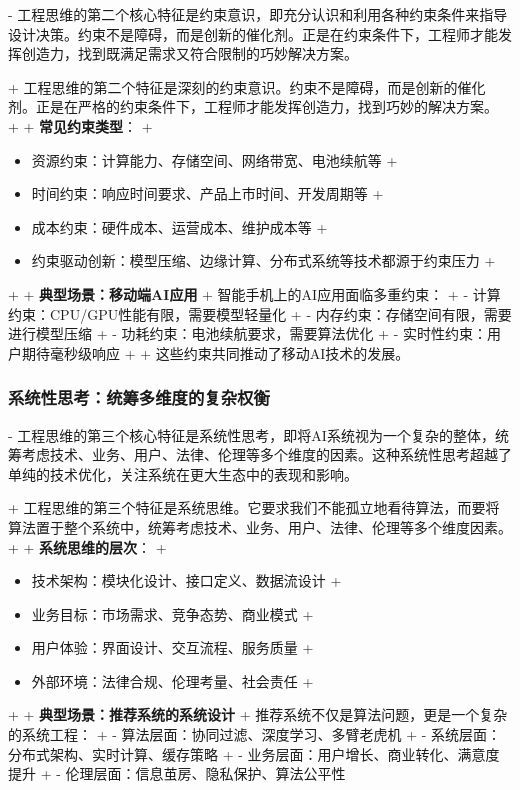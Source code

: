 - 工程思维的第二个核心特征是约束意识，即充分认识和利用各种约束条件来指导设计决策。约束不是障碍，而是创新的催化剂。正是在约束条件下，工程师才能发挥创造力，找到既满足需求又符合限制的巧妙解决方案。

+ 工程思维的第二个特征是深刻的约束意识。约束不是障碍，而是创新的催化剂。正是在严格的约束条件下，工程师才能发挥创造力，找到巧妙的解决方案。
+
+ \textbf{常见约束类型}：
+ \begin{itemize}
+ \item 资源约束：计算能力、存储空间、网络带宽、电池续航等
+ \item 时间约束：响应时间要求、产品上市时间、开发周期等
+ \item 成本约束：硬件成本、运营成本、维护成本等
+ \item 约束驱动创新：模型压缩、边缘计算、分布式系统等技术都源于约束压力
+ \end{itemize}
+
+ \textbf{典型场景：移动端AI应用}
+ 智能手机上的AI应用面临多重约束：
+ - 计算约束：CPU/GPU性能有限，需要模型轻量化
+ - 内存约束：存储空间有限，需要进行模型压缩
+ - 功耗约束：电池续航要求，需要算法优化
+ - 实时性约束：用户期待毫秒级响应
+
+ 这些约束共同推动了移动AI技术的发展。

\subsubsection{系统性思考：统筹多维度的复杂权衡}

- 工程思维的第三个核心特征是系统性思考，即将AI系统视为一个复杂的整体，统筹考虑技术、业务、用户、法律、伦理等多个维度的因素。这种系统性思考超越了单纯的技术优化，关注系统在更大生态中的表现和影响。

+ 工程思维的第三个特征是系统思维。它要求我们不能孤立地看待算法，而要将算法置于整个系统中，统筹考虑技术、业务、用户、法律、伦理等多个维度因素。
+
+ \textbf{系统思维的层次}：
+ \begin{itemize}
+ \item 技术架构：模块化设计、接口定义、数据流设计
+ \item 业务目标：市场需求、竞争态势、商业模式
+ \item 用户体验：界面设计、交互流程、服务质量
+ \item 外部环境：法律合规、伦理考量、社会责任
+ \end{itemize}
+
+ \textbf{典型场景：推荐系统的系统设计}
+ 推荐系统不仅是算法问题，更是一个复杂的系统工程：
+ - 算法层面：协同过滤、深度学习、多臂老虎机
+ - 系统层面：分布式架构、实时计算、缓存策略
+ - 业务层面：用户增长、商业转化、满意度提升
+ - 伦理层面：信息茧房、隐私保护、算法公平性

